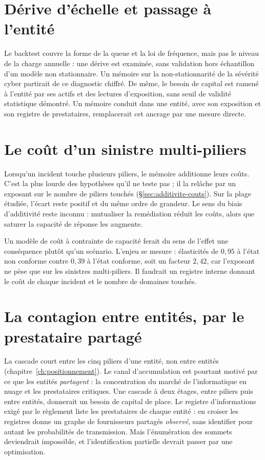 \section{Dérive d'échelle et passage à l'entité}

Le backtest couvre la forme de la queue et la loi de fréquence, mais pas le niveau de la charge
annuelle : une dérive est examinée, sans validation hors échantillon d'un modèle non stationnaire. Un mémoire sur
la non-stationnarité de la sévérité cyber partirait de ce diagnostic chiffré. De même, le besoin de
capital est ramené à l'entité par ses actifs et des lectures d'exposition, sans seuil de
validité statistique démontré. Un mémoire conduit dans une entité, avec son exposition et son registre de
prestataires, remplacerait cet ancrage par une mesure directe.

\section{Le coût d'un sinistre multi-piliers}

Lorsqu'un incident touche plusieurs piliers, le mémoire additionne leurs coûts. C'est la plus lourde
des hypothèses qu'il ne teste pas ; il la relâche par un exposant sur le nombre de piliers touchés
(\S\ref{sec:additivite-couts}). Sur la plage étudiée, l'écart reste positif et du même ordre de grandeur.
Le sens du biais d'additivité reste inconnu : mutualiser la remédiation réduit les coûts,
alors que saturer la capacité de réponse les augmente.

Un modèle de coût
à contrainte de capacité ferait du sens de l'effet une conséquence plutôt qu'un scénario. L'enjeu
se mesure : élasticités de $0{,}95$ à l'état non conforme contre $0{,}39$ à l'état conforme, soit un
facteur $2{,}42$, car l'exposant ne pèse que sur les sinistres multi-piliers. Il faudrait un registre
interne donnant le coût de chaque incident et le nombre de domaines touchés.


\section{La contagion entre entités, par le prestataire partagé}

La cascade court entre les cinq piliers d'une entité, non entre entités (chapitre~\ref{ch:positionnement}).
Le canal d'accumulation est pourtant motivé par ce que les entités \emph{partagent} : la concentration
du marché de l'informatique en nuage et les prestataires critiques. Une cascade à deux étages, entre
piliers puis entre entités, donnerait un besoin de capital de place. Le registre d'informations exigé
par le règlement liste les prestataires de chaque entité : en croiser les registres donne un graphe de
fournisseurs partagés \emph{observé}, sans identifier pour autant les probabilités de transmission. Mais l'énumération des sommets
deviendrait impossible, et l'identification partielle devrait passer par une optimisation.


